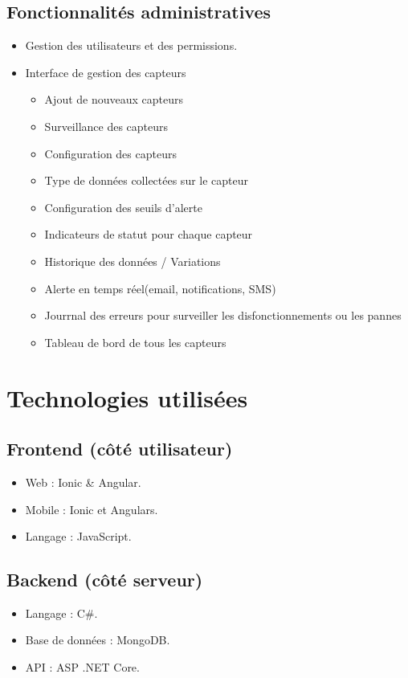 \documentclass[a4paper,12pt]{article}
\begin{document}
\subsection{Fonctionnalités administratives}
\begin{itemize}
    \item Gestion des utilisateurs et des permissions.
    
    \item Interface de gestion des capteurs
    \begin{itemize}
        \item Ajout de nouveaux capteurs
        \item Surveillance des capteurs
        \item Configuration des capteurs
        \item Type de données collectées sur le capteur
	\item Configuration des seuils d'alerte
        \item Indicateurs de statut pour chaque capteur
     \item Historique des données / Variations
    \item Alerte en temps réel(email, notifications, SMS)
	\item Jourrnal des erreurs pour surveiller les disfonctionnements ou les pannes
\item Tableau de bord de tous les capteurs 
    
\end{itemize}
\end{itemize}

\section{Technologies utilisées}
\subsection{Frontend (côté utilisateur)}
\begin{itemize}
    \item Web : Ionic \&  Angular.
    \item Mobile : Ionic et Angulars.
  \item Langage : JavaScript.

\end{itemize}

\subsection{Backend (côté serveur)}
\begin{itemize}
    \item Langage : C\#.
    \item Base de données : MongoDB.
    \item API : ASP .NET Core.
\end{itemize}
\end{document}
